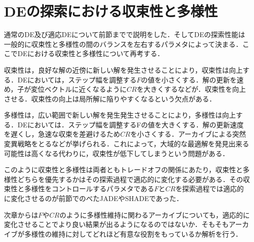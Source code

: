 \documentclass[a4paper,11pt,oneside,openany]{jsbook}
\begin{document}
\section{DEの探索における収束性と多様性}
通常のDE及び適応DEについて前節までで説明をした．そしてDEの探索性能は一般的に収束性と多様性の間のバランスを左右するパラメタによって決まる．ここでDEにおける収束性と多様性について再考する．

収束性は，良好な解の近傍に新しい解を発生させることにより，収束性は向上する．DEにおいては，ステップ幅を調整する$F$の値を小さくする．解の更新を速め，子が変位ベクトルに近くなるように$CR$を大きくするなどが．収束性を向上させる．収束性の向上は局所解に陥りやすくなるという欠点がある．

多様性は，広い範囲で新しい解を発生発生させることにより，多様性は向上する．DEにおいては．ステップ幅を調整するFの値を大きくする．解の更新速度を遅くし，急速な収束を差避けるため$CR$を小さくする．アーカイブによる突然変異戦略をとるなどが挙げられる．これによって，大域的な最適解を発見出来る可能性は高くなる代わりに，収束性が低下してしまうという問題がある．

このように収束性と多様性は両者ともトレードオフの関係にあたり，収束性と多様性どちらを優先するかはその探索過程で適応的に変化する必要がある．その収束性と多様性をコントロールするパラメタである$F$と$CR$を探索過程では適応的に変化させるのが前節でのべたJADEやSHADEであった．

次章からは$F$や$CR$のように多様性維持に関わるアーカイブについても，適応的に変化させることでより良い結果が出るようになるのではないか．そもそもアーカイブが多様性の維持に対してどれほど有意な役割をもっているか解析を行う．

\end{document}
